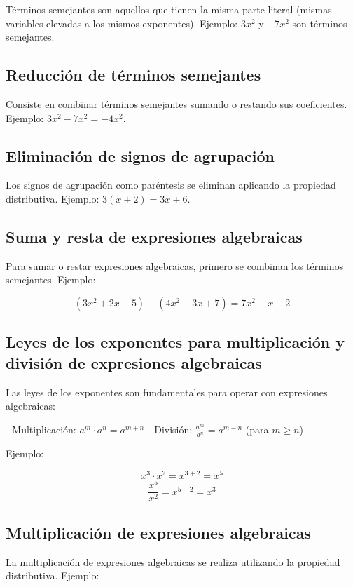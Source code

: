 Términos semejantes son aquellos que tienen la misma parte literal (mismas variables elevadas a los mismos exponentes). Ejemplo: \(3x^2\) y \(-7x^2\) son términos semejantes.

\subsection{Reducción de términos semejantes}

Consiste en combinar términos semejantes sumando o restando sus coeficientes. Ejemplo: \(3x^2 - 7x^2 = -4x^2\).

\subsection{Eliminación de signos de agrupación}

Los signos de agrupación como paréntesis se eliminan aplicando la propiedad distributiva. Ejemplo: \(3(x + 2) = 3x + 6\).

\subsection{Suma y resta de expresiones algebraicas}

Para sumar o restar expresiones algebraicas, primero se combinan los términos semejantes. Ejemplo:

\[
(3x^2 + 2x - 5) + (4x^2 - 3x + 7) = 7x^2 - x + 2
\]

\subsection{Leyes de los exponentes para multiplicación y división de expresiones algebraicas}

Las leyes de los exponentes son fundamentales para operar con expresiones algebraicas:

- Multiplicación: \(a^m \cdot a^n = a^{m+n}\)
- División: \(\frac{a^m}{a^n} = a^{m-n}\) (para \(m \geq n\))

Ejemplo:

\[
x^3 \cdot x^2 = x^{3+2} = x^5
\]
\[
\frac{x^5}{x^2} = x^{5-2} = x^3
\]

\subsection{Multiplicación de expresiones algebraicas}

La multiplicación de expresiones algebraicas se realiza utilizando la propiedad distributiva. Ejemplo:

